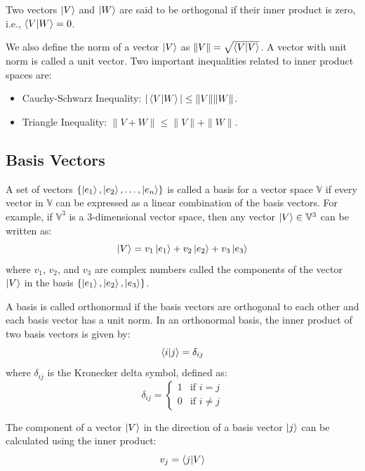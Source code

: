 \documentclass[12pt,a4paper]{report}
\newcommand{\vecspace}[1]{\mathbb{#1}}
\begin{document}
Two vectors $\ket{V}$ and $\ket{W}$ are said to be orthogonal if their inner product is zero, i.e., $\bra{V}\ket{W} = 0$.

We also define the norm of a vector $\ket{V}$ as $\|V\| = \sqrt{\bra{V}\ket{V}}$. A vector with unit norm is called a unit vector.
Two important inequalities related to inner product spaces are:

\begin{itemize}
    \item Cauchy-Schwarz Inequality: $|\bra{V}\ket{W}| \leq \|V\| \|W\|$.
    \item Triangle Inequality: $\|V + W\| \leq \|V\| + \|W\|$.
\end{itemize}

\subsection{Basis Vectors}

A set of vectors $\{\ket{e_1}, \ket{e_2}, \ldots, \ket{e_n}\}$ is called a basis for a vector space $\vecspace{V}$ if every vector in $\vecspace{V}$ can be expressed as a linear combination of the basis vectors. For example, if $\vecspace{V}^3$ is a 3-dimensional vector space, then any vector $\ket{V} \in \vecspace{V}^3$ can be written as:
\begin{equation*}
    \ket{V} = v_1\ket{e_1} + v_2\ket{e_2} + v_3\ket{e_3}
\end{equation*}
where $v_1$, $v_2$, and $v_3$ are complex numbers called the components of the vector $\ket{V}$ in the basis $\{\ket{e_1}, \ket{e_2}, \ket{e_3}\}$.

A basis is called orthonormal if the basis vectors are orthogonal to each other and each basis vector has a unit norm. In an orthonormal basis, the inner product of two basis vectors is given by:
\begin{equation*}
    \bra{i}\ket{j} = \delta_{ij}
\end{equation*}
where $\delta_{ij}$ is the Kronecker delta symbol, defined as:
\begin{equation*}
    \delta_{ij} = \begin{cases}
        1 & \text{if } i = j \\
        0 & \text{if } i \neq j
    \end{cases}
\end{equation*}

The component of a vector $\ket{V}$ in the direction of a basis vector $\ket{j}$ can be calculated using the inner product:
\begin{equation*}
    v_j = \bra{j}\ket{V}
\end{equation*}
\end{document}
